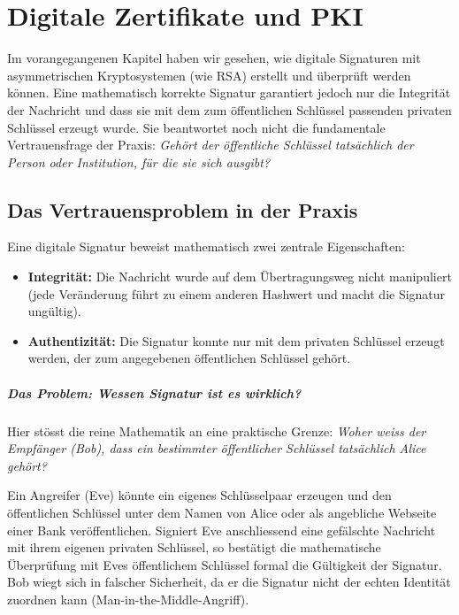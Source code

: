 \chapter{Digitale Zertifikate und \texorpdfstring{\acrshort{PKI}}{PKI}}\label{chap:zertifikate-pki}

Im vorangegangenen Kapitel haben wir gesehen, wie digitale Signaturen mit asymmetrischen Kryptosystemen (wie \gls{RSA}) erstellt und überprüft werden können. Eine mathematisch korrekte Signatur garantiert jedoch nur die Integrität der Nachricht und dass sie mit dem zum öffentlichen Schlüssel passenden privaten Schlüssel erzeugt wurde. Sie beantwortet noch nicht die fundamentale Vertrauensfrage der Praxis: \emph{Gehört der öffentliche Schlüssel tatsächlich der Person oder Institution, für die sie sich ausgibt?}

\section{Das Vertrauensproblem in der Praxis}
Eine digitale Signatur beweist mathematisch zwei zentrale Eigenschaften:
\begin{itemize}
	\item \textbf{Integrität:} Die Nachricht wurde auf dem Übertragungsweg nicht manipuliert (jede Veränderung führt zu einem anderen Hashwert und macht die Signatur ungültig).
	\item \textbf{Authentizität:} Die Signatur konnte nur mit dem privaten Schlüssel erzeugt werden, der zum angegebenen öffentlichen Schlüssel gehört.
\end{itemize}

\paragraph*{Das Problem: Wessen Signatur ist es wirklich?}
Hier stösst die reine Mathematik an eine praktische Grenze: \emph{Woher weiss der Empfänger (Bob), dass ein bestimmter öffentlicher Schlüssel tatsächlich Alice gehört?}

Ein Angreifer (Eve) könnte ein eigenes Schlüsselpaar erzeugen und den öffentlichen Schlüssel unter dem Namen von Alice oder als angebliche Webseite einer Bank veröffentlichen. Signiert Eve anschliessend eine gefälschte Nachricht mit ihrem eigenen privaten Schlüssel, so bestätigt die mathematische Überprüfung mit Eves öffentlichem Schlüssel formal die Gültigkeit der Signatur. Bob wiegt sich in falscher Sicherheit, da er die Signatur nicht der echten Identität zuordnen kann (Man-in-the-Middle-Angriff).

